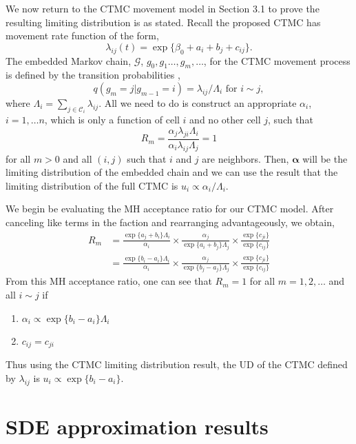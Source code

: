 \documentclass[12pt]{article}
\newcommand{\ba}{\ensuremath{\boldsymbol{\alpha}}}
\newcommand{\fG}{\ensuremath{\mathcal{G}}}
\newcommand{\fC}{\ensuremath{\mathcal{C}}}
\begin{document}
We now return to the CTMC movement model in Section 3.1 to prove the resulting limiting distribution is as stated. Recall the proposed CTMC has movement rate function of the form,
\[
\lambda_{ij}(t) = \exp\{\beta_0 + a_i + b_j + c_{ij}\}.
\]
The embedded Markov chain, $\fG$, $g_0,g_1\dots,g_m,\dots$, for the CTMC movement process is defined by the transition probabilities \citep{xxx},
\[
q(g_m=j|g_{m-1}=i) = \lambda_{ij}/ \Lambda_i \text{ for } i \sim j,
\]
where $\Lambda_i = \sum_{j\in\fC_i}\lambda_{ij}$. All we need to do is construct an appropriate $\alpha_i$, $i=1,\dots n$, which is only a function of cell $i$ and no other cell $j$, such that
\[
R_m = \frac{\alpha_j\lambda_{ji}\Lambda_i}{\alpha_i\lambda_{ij}\Lambda_j} = 1 
\]
for all $m>0$ and all $(i,j)$ such that $i$ and $j$ are neighbors. Then, $\ba$ will be the limiting distribution of the embedded chain and we can use the result that the limiting distribution of the full CTMC is $u_i \propto \alpha_i/\Lambda_i$.

We begin be evaluating the MH acceptance ratio for our CTMC model. After canceling like terms in the faction and rearranging advantageously, we obtain,
\begin{equation}
\begin{aligned}
R_m &= \frac{\exp\{a_j + b_i\}\Lambda_i}{\alpha_i} \times \frac{\alpha_j}{\exp\{a_i + b_j\}\Lambda_j} \times \frac{\exp\{c_{ji}\}}{\exp\{c_{ij}\}} \\
&= \frac{\exp\{b_i-a_i\}\Lambda_i}{\alpha_i} \times \frac{\alpha_j}{\exp\{b_j-a_j\}\Lambda_j} \times \frac{\exp\{c_{ji}\}}{\exp\{c_{ij}\}}
\end{aligned}
\end{equation}
From this MH acceptance ratio, one can see that $R_m=1$ for all $m = 1,2,\dots$ and all $i\sim j$ if 
\begin{enumerate}
\item $\alpha_i \propto \exp\{b_i-a_i\}\Lambda_i$
\item $c_{ij} = c_{ji}$
\end{enumerate}
Thus using the CTMC limiting distribution result, the UD of the CTMC defined by $\lambda_{ij}$ is $u_i \propto \exp\{b_i-a_i\}$.


\section{SDE approximation results}
\end{document}
